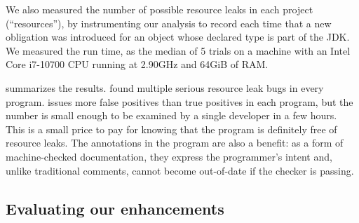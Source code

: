 We also measured the number of
possible resource leaks in each project (``resources''),
by instrumenting our analysis to record each time that
a new obligation was introduced for an object whose declared type
is part of the JDK.
We measured the run time,
as the median of 5 trials on
a machine with an Intel Core i7-10700 CPU running at 2.90GHz and 64GiB of RAM\@.


 summarizes the results. \Tool found multiple
serious resource leak bugs in every program. \Tool issues
more false positives than true positives in each program, but
the number is small enough to be examined by a single developer in a
few hours.  This is a small price to pay for knowing that the program is
definitely free of resource leaks.  The annotations in the program are
also a benefit: as a form of machine-checked documentation, they
express the programmer's intent and, unlike traditional comments,
cannot become out-of-date if the checker is passing.




\subsection{Evaluating our enhancements}
\label{sec:ablation}

\newcommand{\abltablerow}[4]{\textbf{\smaller{#1}} & #2 & #3 & #4}

